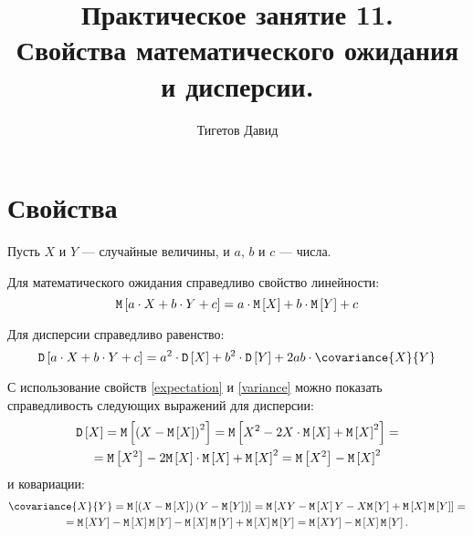 \documentclass[a4paper,12pt]{article}
\begin{document}
    \title{Практическое занятие 11. \\ Свойства математического ожидания и дисперсии.}
    \author{Тигетов Давид}
    \maketitle


    \section{Свойства}
    Пусть $X$ и $Y$ --- случайные величины, и $a$, $b$ и $c$ --- числа.

    Для математического ожидания справедливо свойство линейности:
    \begin{equation}
        \label{expectation}
        \mathtt{M} \left [ a \cdot X + b \cdot Y + c \right ]
        = a \cdot \mathtt{M} \left [ X \right ] + b \cdot \mathtt{M} \left [ Y \right ] + c
    \end{equation}

    Для дисперсии справедливо равенство:
    \begin{equation}
        \label{variance}
        \variance{a \cdot X + b \cdot Y + c}
        = a^2 \cdot \variance{X} + b^2 \cdot \variance{Y} + 2 a b \cdot \covariance{X}{Y}
    \end{equation}

    С использование свойств \eqref{expectation} и \eqref{variance} можно показать справедливость следующих выражений для дисперсии:
    \begin{multline}
        \mathtt{D} \left [ X \right ]
        = \mathtt{M} \left [ \left ( X - \mathtt{M} \left [ X \right ] \right )^2 \right ]
        = \mathtt{M} \left [ X^2 - 2 X \cdot \mathtt{M} \left [ X \right ] + \mathtt{M} \left [ X \right ]^2 \right ] = \\
        = \mathtt{M} \left [ X^2 \right ] - 2 \mathtt{M} \left [ X \right ] \cdot \mathtt{M} \left [ X \right ] + \mathtt{M} \left [ X \right ]^2
        = \mathtt{M} \left [ X^2 \right ] - \mathtt{M} \left [ X \right ]^2
    \end{multline}
    и ковариации:
    \begin{multline}
        \label{covariance}
        \covariance{X}{Y}
        = \expectation{\left ( X - \expectation{X} \right ) \left ( Y - \expectation{Y} \right )}
        = \expectation{ X Y - \expectation{X} Y - X \expectation{Y} + \expectation{X} \expectation{Y}} = \\
        = \expectation{XY} - \expectation{X} \expectation{Y} - \expectation{X} \expectation{Y} + \expectation{X} \expectation{Y}
        = \expectation{XY} - \expectation{X} \expectation{Y} .
    \end{multline}
\end{document}

